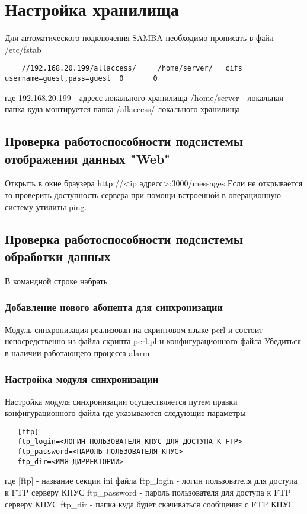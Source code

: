\documentclass[12pt]{article}[a4paper,14pt,russian]
\begin{document}
	\section{Настройка хранилища}
	Для автоматического подключения SAMBA необходимо прописать в файл
	/etc/fstab
	\begin{verbatim}
	//192.168.20.199/allaccess/     /home/server/   cifs username=guest,pass=guest  0       0
	\end{verbatim}
	где 192.168.20.199 - адресс локального хранилища
	/home/server - локальная папка куда монтируется папка /allaccess/ локального хранилища
	\subsection{Проверка работоспособности подсистемы отображения данных "Web"}
	Открыть в окне браузера http://<ip адресс>:3000/messages
	Если не открывается то проверить доступность сервера при
	помощи встроенной в операционную систему утилиты ping.
	
    \subsection{Проверка работоспособности подсистемы обработки данных}
    В командной строке набрать 
    \subsubsection{Добавление нового абонента для синхронизации}
    Модуль синхронизация реализован на скриптовом языке perl и состоит непосредственно
    из файла скрипта perl.pl и конфигурационного файла
    Убедиться в наличии работающего процесса alarm.
    
   \subsubsection{Настройка модуля синхронизации}
   Настройка модуля синхронизации осуществляется путем правки конфигурационного файла где указываются следующие параметры
   \begin{verbatim}
   [ftp]
   ftp_login=<ЛОГИН ПОЛЬЗОВАТЕЛЯ КПУС ДЛЯ ДОСТУПА К FTP>
   ftp_password=<ПАРОЛЬ ПОЛЬЗОВАТЕЛЯ КПУС>
   ftp_dir=<ИМЯ ДИРРЕКТОРИИ>
   \end{verbatim}
  
   где
    [ftp] - название секции ini файла
    ftp\_login - логин пользователя для доступа к FTP серверу КПУС
    ftp\_password - пароль пользователя для доступа к FTP серверу КПУС
    ftp\_dir - папка куда будет  скачиваться сообщения с FTP КПУС
    
\end{document}
